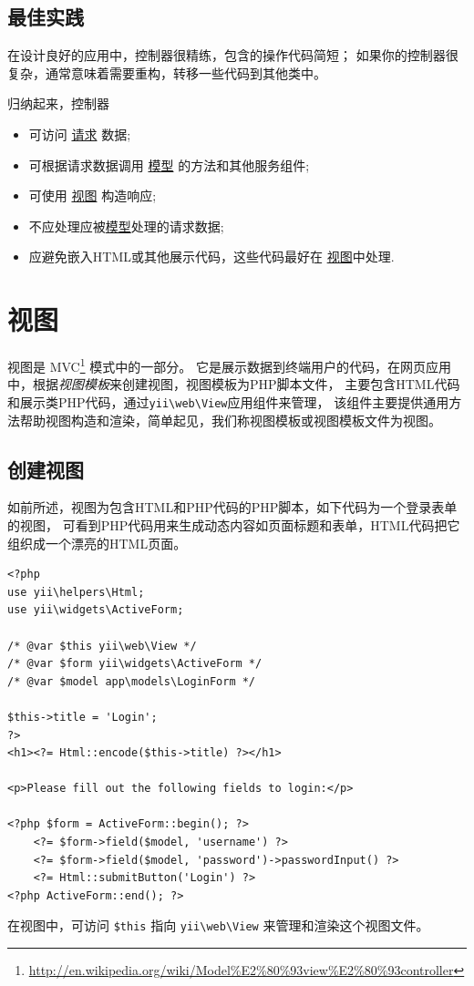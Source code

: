 \subsection{最佳实践 \label{structure-controllers.md::best-practices}}
在设计良好的应用中，控制器很精练，包含的操作代码简短；
如果你的控制器很复杂，通常意味着需要重构，转移一些代码到其他类中。

归纳起来，控制器

\begin{itemize}
\item 可访问 \hyperref[runtime-requests.md]{请求} 数据;
\item 可根据请求数据调用 \hyperref[structure-models.md]{模型} 的方法和其他服务组件;
\item 可使用 \hyperref[structure-views.md]{视图} 构造响应;
\item 不应处理应被\hyperref[structure-models.md]{模型}处理的请求数据;
\item 应避免嵌入HTML或其他展示代码，这些代码最好在 \hyperref[structure-views.md]{视图}中处理.
\end{itemize}


\label{structure-views.md}\section{视图}
视图是 MVC\footnote{\url{http://en.wikipedia.org/wiki/Model\%E2\%80\%93view\%E2\%80\%93controller}} 模式中的一部分。
它是展示数据到终端用户的代码，在网页应用中，根据\textit{视图模板}来创建视图，视图模板为PHP脚本文件，
主要包含HTML代码和展示类PHP代码，通过\texttt{yii{\allowbreak{}\textbackslash}web{\allowbreak{}\textbackslash}View}应用组件来管理，
该组件主要提供通用方法帮助视图构造和渲染，简单起见，我们称视图模板或视图模板文件为视图。

\subsection{创建视图 \label{structure-views.md::creating-views}}
如前所述，视图为包含HTML和PHP代码的PHP脚本，如下代码为一个登录表单的视图，
可看到PHP代码用来生成动态内容如页面标题和表单，HTML代码把它组织成一个漂亮的HTML页面。

\lstset{language=php}\begin{lstlisting}
<?php
use yii\helpers\Html;
use yii\widgets\ActiveForm;

/* @var $this yii\web\View */
/* @var $form yii\widgets\ActiveForm */
/* @var $model app\models\LoginForm */

$this->title = 'Login';
?>
<h1><?= Html::encode($this->title) ?></h1>

<p>Please fill out the following fields to login:</p>

<?php $form = ActiveForm::begin(); ?>
    <?= $form->field($model, 'username') ?>
    <?= $form->field($model, 'password')->passwordInput() ?>
    <?= Html::submitButton('Login') ?>
<?php ActiveForm::end(); ?>
\end{lstlisting}
在视图中，可访问 \lstinline|$this| 指向 \texttt{yii{\allowbreak{}\textbackslash}web{\allowbreak{}\textbackslash}View} 来管理和渲染这个视图文件。

